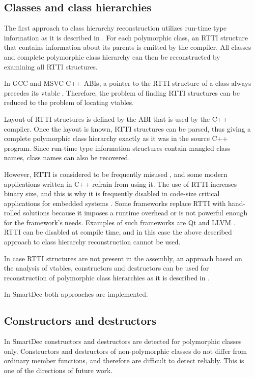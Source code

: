 \documentclass[10pt, conference, compsocconf]{IEEEtran}
\newcommand{\skipsectionspace}{}
\begin{document}
\subsection{Classes and class hierarchies}\skipsectionspace
The first approach to class hierarchy reconstruction utilizes
run-time type information as it is described in \cite{fokin10, sabanal07, skochinsky06c}. 
For each polymorphic class, an RTTI structure that 
contains information about its parents is emitted by the compiler.
All classes and complete polymorphic class hierarchy 
can then be reconstructed by examining all RTTI structures.

In GCC and MSVC C++ ABIs, a pointer to the RTTI structure
of a class always precedes its vtable \cite{gccabi, gray94}.
Therefore, the problem of finding RTTI structures can be reduced
to the problem of locating vtables.

Layout of RTTI structures is defined by the ABI that is used by the C++ compiler.
Once the layout is known, RTTI structures can be parsed, thus
giving a complete polymorphic class hierarchy exactly as it was in the source C++ program.
Since run-time type information structures contain mangled class names, 
class names can also be recovered.

However, RTTI is considered to be frequently misused
\cite{stroustrup93}, and some modern applications written
in C++ refrain from using it. 
The use of RTTI increases binary size, and this is why it is
frequently disabled in code-size critical applications for
embedded systems \cite{quiroz98, cpppftr03}. 
Some frameworks replace RTTI with hand-rolled solutions because
it imposes a runtime overhead or is not powerful enough for the 
framework's needs.
Examples of such frameworks are Qt \cite{qt} and LLVM \cite{llvm}.
RTTI can be disabled at compile 
time, and in this case the above described approach to class 
hierarchy reconstruction cannot be used.

In case RTTI structures are not present in the assembly, 
an approach based on the analysis of vtables,
constructors and destructors can be used for reconstruction of
polymorphic class hierarchies as it is described in \cite{fokin10}.

In SmartDec both approaches are implemented.



\subsection{Constructors and destructors}\skipsectionspace
In SmartDec constructors and destructors are detected for polymorphic classes only. 
Constructors and destructors of non-polymorphic classes do not differ from
ordinary member functions, and therefore are difficult to detect reliably. 
This is one of the directions of future work.
\end{document}
